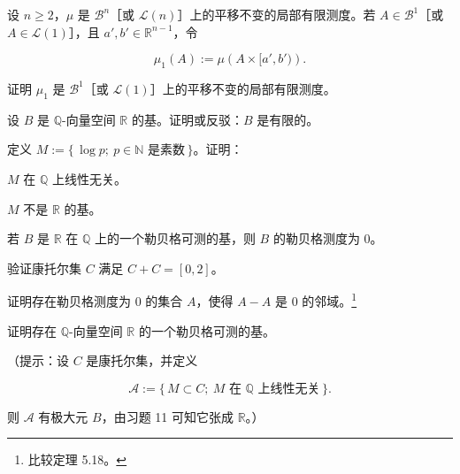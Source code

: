 \begin{exercises}
\begin{items}
\end{items}

\item

设 $ n \ge 2 $，$ \mu $ 是 $ \mathcal{B}^n $［或 $ \mathcal{L}(n) $］上的平移不变的局部有限测度。若 $ A \in \mathcal{B}^1 $［或 $ A \in \mathcal{L}(1) $］，且 $ a', b' \in \mathbb{R}^{n-1} $，令

\[
\mu_1(A) := \mu\left(A \times [a', b')\right) .
\]

证明 $ \mu_1 $ 是 $ \mathcal{B}^1 $［或 $ \mathcal{L}(1) $］上的平移不变的局部有限测度。

\item

设 $ B $ 是 $ \mathbb{Q} $-向量空间 $ \mathbb{R} $ 的基。证明或反驳：$ B $ 是有限的。

\item

定义 $ M := \{\, \log p ;\ p \in \mathbb{N} \text{ 是素数} \,\} $。证明：

\begin{items}
\item

$ M $ 在 $ \mathbb{Q} $ 上线性无关。

\item

$ M $ 不是 $ \mathbb{R} $ 的基。

\end{items}

\item

若 $ B $ 是 $ \mathbb{R} $ 在 $ \mathbb{Q} $ 上的一个勒贝格可测的基，则 $ B $ 的勒贝格测度为 0。

\item

验证康托尔集 $ C $ 满足 $ C + C = [0,2] $。

\item

证明存在勒贝格测度为 0 的集合 $ A $，使得 $ A - A $ 是 $ 0 $ 的邻域。\footnote{比较定理 5.18。}

\item

证明存在 $ \mathbb{Q} $-向量空间 $ \mathbb{R} $ 的一个勒贝格可测的基。

（提示：设 $ C $ 是康托尔集，并定义

\[
\mathcal{A} := \{\, M \subset C ;\ M \text{ 在 } \mathbb{Q} \text{ 上线性无关} \,\} .
\]

则 $ \mathcal{A} $ 有极大元 $ B $，由习题 11 可知它张成 $ \mathbb{R} $。）


\end{exercises}
